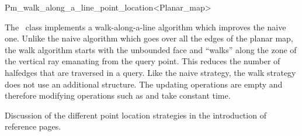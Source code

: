 
\ccRefPageBegin


\renewcommand{\ccRefPageBegin}{\begin{ccAdvanced}}
\renewcommand{\ccRefPageEnd}{\end{ccAdvanced}}

\begin{ccRefClass}{Pm_walk_along_a_line_point_location<Planar_map>}
\label{PL_sec:walk}

The \ccRefName\ class 
implements a walk-along-a-line algorithm which improves the naive one.
Unlike the naive algorithm which goes over all the edges
of the planar map, the walk algorithm starts with the unbounded face
and ``walks'' along the zone of the vertical ray emanating from the
query point. This reduces the number of halfedges that are traversed
in a query.
Like the naive strategy, the walk strategy does not use an additional
structure. The updating operations are empty and therefore 
modifying operations such as 
 and  take constant time.



\ccIsModel

\ccInheritsFrom

\ccSeeAlso
   Discussion of the different point location strategies in the introduction
of  reference pages.

\end{ccRefClass}
\renewcommand{\ccRefPageBegin}{}
\renewcommand{\ccRefPageEnd}{}


\ccRefPageEnd
